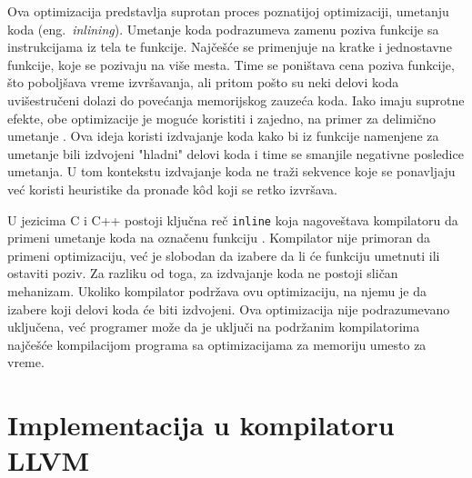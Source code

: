 \documentclass[12pt,oneside]{memoir}
\begin{document}
Ova optimizacija predstavlja suprotan proces poznatijoj optimizaciji, umetanju koda (eng.~{\em inlining}).
Umetanje koda podrazumeva zamenu poziva funkcije sa instrukcijama iz tela te funkcije.
Najčešće se primenjuje na kratke i jednostavne funkcije, koje se pozivaju na više mesta.
Time se poništava cena poziva funkcije, što poboljšava vreme izvršavanja, ali pritom pošto su neki delovi koda uvišestručeni dolazi do povećanja memorijskog zauzeća koda.
Iako imaju suprotne efekte, obe optimizacije je moguće koristiti i zajedno, na primer za delimično umetanje \cite{Zhao2005FunctionOA}.
Ova ideja koristi izdvajanje koda kako bi iz funkcije namenjene za umetanje bili izdvojeni "hladni" delovi koda i time se smanjile negativne posledice umetanja.
U tom kontekstu izdvajanje koda ne traži sekvence koje se ponavljaju već koristi heuristike da pronađe k\^od koji se retko izvršava.

U jezicima C i C++ postoji ključna reč \verb|inline| koja nagoveštava kompilatoru da primeni umetanje koda na označenu funkciju \cite{ISO:C99}.
Kompilator nije primoran da primeni optimizaciju, već je slobodan da izabere da li će funkciju umetnuti ili ostaviti poziv.
Za razliku od toga, za izdvajanje koda ne postoji sličan mehanizam.
Ukoliko kompilator podržava ovu optimizaciju, na njemu je da izabere koji delovi koda će biti izdvojeni.
Ova optimizacija nije podrazumevano uključena, već programer može da je uključi na podržanim kompilatorima najčešće kompilacijom programa sa optimizacijama za memoriju umesto za vreme.

\section{Implementacija u kompilatoru LLVM}
\end{document}
